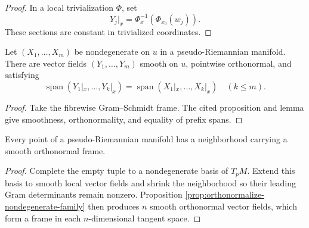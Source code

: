 \begin{proof}

\sketch In a local trivialization $\Phi$, set
\[
Y_j|_x=\Phi_x^{-1}(\Phi_{x_0}(w_j)).
\]
These sections are constant in trivialized coordinates.
\end{proof}

\begin{proposition}
\label{prop:orthonormalize-nondegenerate-family}





Let $(X_1,\ldots,X_m)$ be nondegenerate on $u$ in a pseudo-Riemannian manifold.
There are vector fields $(Y_1,\ldots,Y_m)$ smooth on $u$, pointwise orthonormal,
and satisfying
\[
\operatorname{span}(Y_1|_x,\ldots,Y_k|_x)
=\operatorname{span}(X_1|_x,\ldots,X_k|_x)
\quad(k\leq m).
\]
\end{proposition}

\begin{proof}

\sketch Take the fibrewise Gram--Schmidt frame. The cited proposition and lemma
give smoothness, orthonormality, and equality of prefix spans.
\end{proof}

\begin{proposition}
\label{prop:orthonormal-frames-pseudo-riemannian}





Every point of a pseudo-Riemannian manifold has a neighborhood carrying a smooth
orthonormal frame.
\end{proposition}

\begin{proof}

\sketch Complete the empty tuple to a nondegenerate basis of $T_pM$. Extend this
basis to smooth local vector fields and shrink the neighborhood so their leading
Gram determinants remain nonzero. Proposition
\ref{prop:orthonormalize-nondegenerate-family} then produces $n$ smooth
orthonormal vector fields, which form a frame in each $n$-dimensional tangent
space.
\end{proof}

